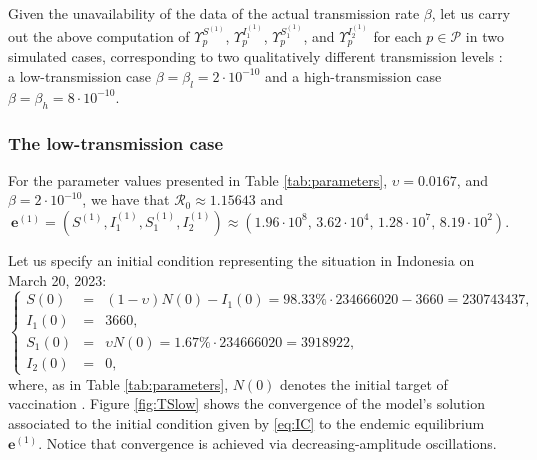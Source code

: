 \documentclass[11pt,reqno]{amsart}
\newcommand{\cR}{\mathcal{R}}
\begin{document}
Given the unavailability of the data of the actual transmission rate $\beta$, let us carry out the above computation of $\Upsilon^{S^{(1)}}_{p}$, $\Upsilon^{I_1^{(1)}}_{p}$, $\Upsilon^{S_1^{(1)}}_{p}$, and $\Upsilon^{I_2^{(1)}}_{p}$ for each $p\in\mathcal{P}$ in two simulated cases, corresponding to two qualitatively different transmission levels \cite[sec.\ 3]{ChitnisHymanCushing}: a low-transmission case $\beta=\beta_l=2\cdot 10^{-10}$ and a high-transmission case $\beta=\beta_h=8\cdot 10^{-10}$.\smallskip


\subsubsection*{The low-transmission case}

For the parameter values presented in Table \ref{tab:parameters}, $\upsilon=0.0167$, and $\beta=2\cdot 10^{-10}$, we have that $\cR_0\approx 1.15643$ and
$$\mathbf{e}^{(1)}=\left(S^{(1)},I_1^{(1)},S_1^{(1)}, I_2^{(1)}\right)\approx\left(1.96\cdot 10^8,\, 3.62\cdot 10^4,\, 1.28\cdot 10^7,\, 8.19\cdot 10^{2}\right).$$

Let us specify an initial condition representing the situation in Indonesia on March 20, 2023:
\begin{equation}\label{eq:IC}
\left\{\begin{array}{rcl}
 S\left( 0\right) \!\!\!&=&\!\!\!(1-\upsilon) N\left( 0\right)-I_{1}\left( 0\right)=98.33\%\cdot 234666020-3660=230743437,\\[0.1cm]
I_{1}\left( 0\right)\!\!\!&=&\!\!\!3660,\\[0.1cm]
S_{1}\left( 0\right) \!\!\!&=&\!\!\!\upsilon N\left( 0\right)= 1.67\%\cdot 234666020=3918922,\\[0.1cm]
 I_2(0)\!\!\!&=&\!\!\!0,
 \end{array}\right.
\end{equation}
where, as in Table \ref{tab:parameters}, $N(0)$ denotes the initial target of vaccination \cite{AndiKurmalaNasution,Pinandhita}. Figure \ref{fig:TSlow} shows the convergence of the model's solution associated to the initial condition given by \eqref{eq:IC} to the endemic equilibrium $\mathbf{e}^{(1)}$. Notice that convergence is achieved via decreasing-amplitude oscillations.
\end{document}
